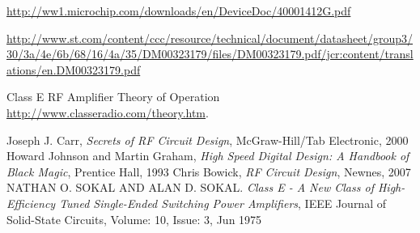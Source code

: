 \begin{thebibliography}{99}
\label{sec:ref}

	\url{http://ww1.microchip.com/downloads/en/DeviceDoc/40001412G.pdf}

	\url{http://www.st.com/content/ccc/resource/technical/document/datasheet/group3/30/3a/4e/6b/68/16/4a/35/DM00323179/files/DM00323179.pdf/jcr:content/translations/en.DM00323179.pdf}

	Class E RF Amplifier Theory of Operation
	\url{http://www.classeradio.com/theory.htm}.


	Joseph J. Carr,  \emph{Secrets of RF Circuit Design}, McGraw-Hill/Tab Electronic, 2000
	Howard Johnson and Martin Graham,  \emph{High Speed Digital Design: A Handbook of Black Magic},  Prentice Hall, 1993
	Chris Bowick,  \emph{RF Circuit Design}, Newnes, 2007
	NATHAN O. SOKAL AND ALAN D. SOKAL. \emph{Class E - A New Class of High-Efficiency Tuned Single-Ended Switching Power Amplifiers},  IEEE Journal of Solid-State Circuits, Volume: 10, Issue: 3, Jun 1975 




\begin{comment}
\bibitem{overprotection}
	Overvoltage and Reverce-voltage Protection in Automotive Systems,
	Application note 760, \emph{Maxim integrated}, Apr 02, 2002, 
	\url{https://www.maximintegrated.com/en/app-notes/index.mvp/id/760}.
\end{comment}




\end{thebibliography}
